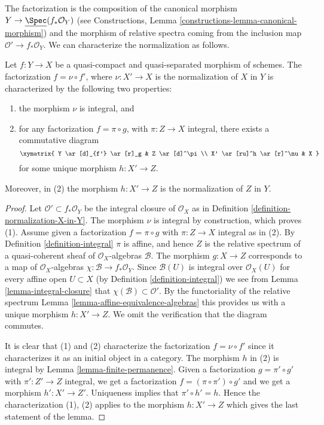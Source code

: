 \noindent
The factorization is the composition of the canonical morphism
$Y \to \underline{\Spec}(f_*\mathcal{O}_Y)$ (see
Constructions, Lemma
\ref{constructions-lemma-canonical-morphism})
and the morphism of relative spectra coming from the inclusion map
$\mathcal{O}' \to f_*\mathcal{O}_Y$. We can characterize the
normalization as follows.

\begin{lemma}
\label{lemma-characterize-normalization}
Let $f : Y \to X$ be a quasi-compact and quasi-separated morphism of schemes.
The factorization $f = \nu \circ f'$, where $\nu : X' \to X$ is the
normalization of $X$ in $Y$ is characterized by the following
two properties:
\begin{enumerate}
\item the morphism $\nu$ is integral, and
\item for any factorization $f = \pi \circ g$, with $\pi : Z \to X$
integral, there exists a commutative diagram
$$
\xymatrix{
Y \ar[d]_{f'} \ar[r]_g & Z \ar[d]^\pi \\
X' \ar[ru]^h \ar[r]^\nu & X
}
$$
for some unique morphism $h : X' \to Z$.
\end{enumerate}
Moreover, in (2) the morphism $h : X' \to Z$ is the normalization of
$Z$ in $Y$.
\end{lemma}

\begin{proof}
Let $\mathcal{O}' \subset f_*\mathcal{O}_Y$ be the integral closure of
$\mathcal{O}_X$ as in Definition \ref{definition-normalization-X-in-Y}.
The morphism $\nu$ is integral by construction, which proves (1).
Assume given a factorization $f = \pi \circ g$ with $\pi : Z \to X$
integral as in (2). By Definition \ref{definition-integral}
$\pi$ is affine, and hence $Z$ is the relative
spectrum of a quasi-coherent sheaf of $\mathcal{O}_X$-algebras $\mathcal{B}$.
The morphism $g : X \to Z$ corresponds to a map of $\mathcal{O}_X$-algebras
$\chi : \mathcal{B} \to f_*\mathcal{O}_Y$. Since $\mathcal{B}(U)$ is
integral over $\mathcal{O}_X(U)$ for every affine open $U \subset X$
(by Definition \ref{definition-integral})
we see from Lemma \ref{lemma-integral-closure}
that $\chi(\mathcal{B}) \subset \mathcal{O}'$.
By the functoriality of the relative spectrum
Lemma \ref{lemma-affine-equivalence-algebras}
this provides us with a unique morphism
$h : X' \to Z$. We omit the verification that the diagram commutes.

\medskip\noindent
It is clear that (1) and (2) characterize the
factorization $f = \nu \circ f'$ since it characterizes it
as an initial object in a category. The morphism $h$ in (2)
is integral by Lemma \ref{lemma-finite-permanence}.
Given a factorization $g = \pi' \circ g'$ with $\pi' : Z' \to Z$
integral, we get a factorization $f = (\pi \circ \pi') \circ g'$ and
we get a morphism $h' : X' \to Z'$. Uniqueness implies that
$\pi' \circ h' = h$. Hence the characterization (1), (2) applies
to the morphism $h : X' \to Z$ which gives the last statement of the lemma.
\end{proof}

